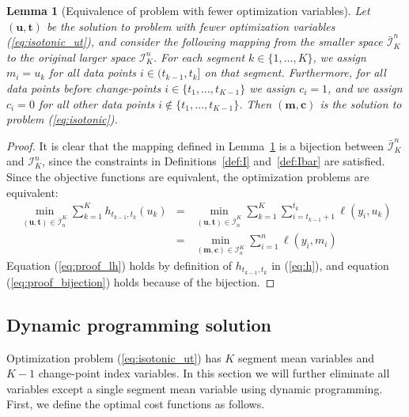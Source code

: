 \documentclass{article}
\newtheorem{lemma}{Lemma}
\begin{document}
\begin{lemma}[Equivalence of problem with fewer optimization variables]
  \label{lemma:fewer-variables}
  Let $(\mathbf u, \mathbf t)$ be the solution to problem with fewer
  optimization variables (\ref{eq:isotonic_ut}), and consider the
  following mapping from the smaller space $\bar{\mathcal I}_K^n$ to
  the original larger space $\mathcal I_K^n$. For each segment
  $k\in\{1,\dots,K\}$, we assign $m_i = u_k$ for all data points
  $i\in(t_{k-1},t_k]$ on that segment. Furthermore, for all data
  points before change-points $i\in\{t_1,\dots,t_{K-1}\}$ we assign
  $c_i=1$, and we assign $c_i=0$ for all other data points
  $i\not\in\{t_1,\dots,t_{K-1}\}$. Then $(\mathbf m, \mathbf c)$ is
  the solution to problem (\ref{eq:isotonic}).
\end{lemma}

\begin{proof}
  It is clear that the mapping defined in Lemma~\ref{lemma:fewer-variables} is
  a bijection between $\bar{\mathcal I}_K^n$ and $\mathcal I_K^n$,
  since the constraints in Definitions~\ref{def:I} and~\ref{def:Ibar}
  are satisfied. Since the objective functions are equivalent, the
  optimization problems are equivalent:
  \begin{eqnarray}
  \min_{(\mathbf u, \mathbf t)\in\bar{\mathcal I}_n^K}
  \sum_{k=1}^K
  h_{t_{k-1}, t_k}(u_k) 
    &=& \label{eq:proof_lh}
  \min_{(\mathbf u, \mathbf t)\in\bar{\mathcal I}_n^K}
\sum_{k=1}^K 
        \sum_{i=t_{k-1}+1}^{t_k} \ell(y_i, u_k)\\
    &=& \label{eq:proof_bijection}
  \min_{(\mathbf m, \mathbf c)\in\mathcal I_n^K}
        \sum_{i=1}^{n} \ell(y_i, m_i)
  \end{eqnarray}
  Equation (\ref{eq:proof_lh}) holds by definition of
  $h_{t_{k-1},t_k}$ in (\ref{eq:h}), and equation
  (\ref{eq:proof_bijection}) holds because of the bijection.
\end{proof}

\subsection{Dynamic programming solution}

Optimization problem (\ref{eq:isotonic_ut}) has $K$ segment mean
variables and $K-1$ change-point index variables. In this section we
will further eliminate all variables except a single segment mean
variable using dynamic programming. First, we define the optimal cost
functions as follows.
\end{document}

